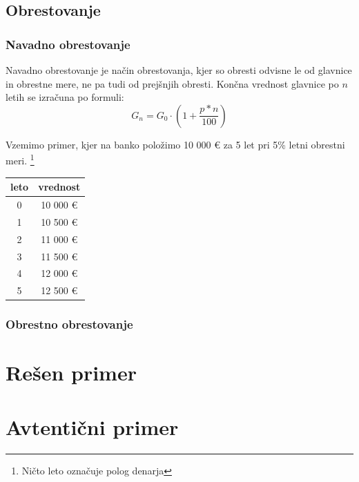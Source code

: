 \documentclass[12pt]{article}
\begin{document}
    \subsection{Obrestovanje}
        \subsubsection{Navadno obrestovanje}
        Navadno obrestovanje je način obrestovanja, kjer so obresti odvisne le od glavnice in obrestne mere,
        ne pa tudi od prejšnjih obresti. Končna vrednost glavnice po $n$ letih se izračuna po formuli:
        \begin{equation}
            G_n = G_0 \cdot (1 + \frac{p*n}{100})
        \end{equation}

        \newpage
        Vzemimo primer, kjer na banko položimo 10 000 € za 5 let pri 5\% letni obrestni meri. 
        \footnote{Ničto leto označuje polog denarja}
        \begin{center}
            
            \begin{tabular}{|c|c|}
                \hline
                \textbf{leto} & \textbf{vrednost} \\ \hline
                0 & 10 000 € \\ \hline
                1 & 10 500 € \\ \hline
                2 & 11 000 € \\ \hline
                3 & 11 500 € \\ \hline
                4 & 12 000 € \\ \hline
                5 & 12 500 € \\ \hline
                
            \end{tabular}
        \end{center}
        \subsubsection{Obrestno obrestovanje}

\section{Rešen primer}
\section{Avtentični primer}
\end{document}
